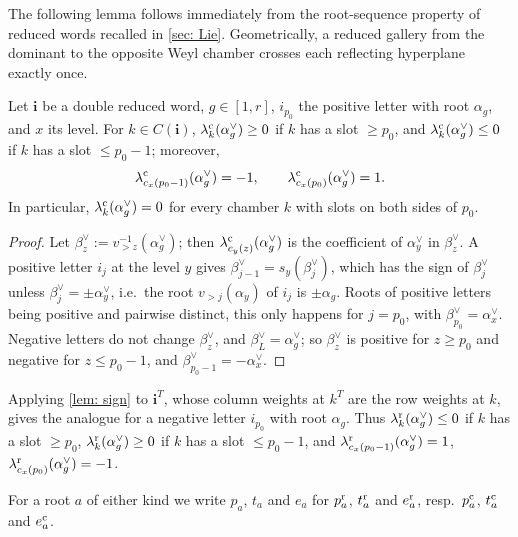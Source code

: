 \documentclass[a4paper]{amsart}
\numberwithin{equation}{section}
\theoremstyle{definition}
\theoremstyle{remark}
\newcommand{\bfi}{\mathbf{i}}
\newcommand{\rr}{{\rm r}}
\newcommand{\cc}{{\rm c}}
\begin{document}
The following lemma follows immediately from the root-sequence property of reduced words recalled in \cref{sec: Lie}.
Geometrically, a reduced gallery from the dominant to the opposite Weyl chamber crosses each reflecting hyperplane exactly once.

\begin{lemma}
  \label{lem: sign}
  Let $\bfi$ be a double reduced word, $g\in[1,r]$, $i_{p_0}$ the positive letter with root $\alpha_g$, and $x$ its level.
  For $k\in C(\bfi)$, $\lambda^\cc_k(\alpha_g^\vee)\ge0$ if $k$ has a slot $\ge p_0$, and $\lambda^\cc_k(\alpha_g^\vee)\le0$ if $k$ has a slot $\le p_0-1$; moreover,
  \[
    \lambda^\cc_{c_x(p_0-1)}(\alpha_g^\vee)=-1,
    \qquad \lambda^\cc_{c_x(p_0)}(\alpha_g^\vee)=1.
  \]
  In particular, $\lambda^\cc_k(\alpha_g^\vee)=0$ for every chamber $k$ with slots on both sides of $p_0$.
\end{lemma}
\begin{proof}

  Let $\beta^\vee_z:=v_{>z}^{-1}(\alpha_g^\vee)$; then $\lambda^\cc_{c_y(z)}(\alpha_g^\vee)$ is the coefficient of $\alpha_y^\vee$ in $\beta^\vee_z$.
  A positive letter $i_j$ at the level $y$ gives $\beta^\vee_{j-1}=s_y(\beta^\vee_j)$, which has the sign of $\beta^\vee_j$ unless $\beta^\vee_j=\pm\alpha_y^\vee$, i.e.\ the root $v_{>j}(\alpha_y)$ of $i_j$ is $\pm\alpha_g$.
  Roots of positive letters being positive and pairwise distinct, this only happens for $j=p_0$, with $\beta^\vee_{p_0}=\alpha_x^\vee$.
  Negative letters do not change $\beta^\vee_z$, and $\beta^\vee_L=\alpha_g^\vee$; so $\beta^\vee_z$ is positive for $z\ge p_0$ and negative for $z\le p_0-1$, and $\beta^\vee_{p_0-1}=-\alpha_x^\vee$.
\end{proof}
Applying \cref{lem: sign} to $\bfi^T$, whose column weights at $k^T$ are the row weights at $k$, gives the analogue for a negative letter $i_{p_0}$ with root $\alpha_g$.
Thus $\lambda^\rr_k(\alpha_g^\vee)\le0$ if $k$ has a slot $\ge p_0$, $\lambda^\rr_k(\alpha_g^\vee)\ge0$ if $k$ has a slot $\le p_0-1$, and $\lambda^\rr_{c_x(p_0-1)}(\alpha_g^\vee)=1$, $\lambda^\rr_{c_x(p_0)}(\alpha_g^\vee)=-1$.

For a root $a$ of either kind we write $p_a$, $t_a$ and $e_a$ for $p^\rr_a$, $t^\rr_a$ and $e^\rr_a$, resp.\ $p^\cc_a$, $t^\cc_a$ and $e^\cc_a$.
\end{document}
